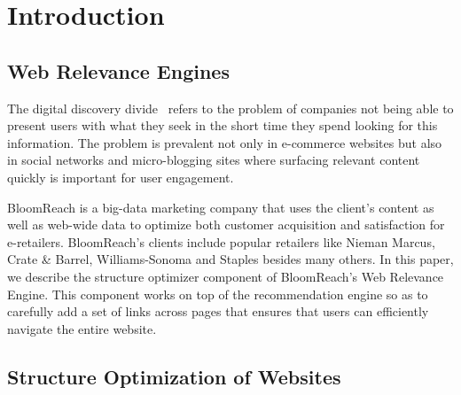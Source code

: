 \section{Introduction}

\subsection{Web Relevance Engines}
The digital discovery divide~\cite{WebRelevanceEngine} refers to the problem of companies not being able to present users with what they seek in the short time they spend looking for this information. The problem is prevalent not only in e-commerce websites but also in social networks and micro-blogging sites where surfacing relevant content quickly is important for user engagement.  

BloomReach is a big-data marketing company that uses the client's content as well as web-wide data to optimize both customer acquisition and satisfaction for e-retailers.
BloomReach's clients include popular retailers like Nieman Marcus, Crate \& Barrel, Williams-Sonoma and Staples besides many others. In this paper, we describe the structure optimizer component of BloomReach's Web Relevance Engine. This component works on top of the recommendation engine so as to carefully add a set of links across pages that ensures that users can efficiently navigate the entire website.

\subsection{Structure Optimization of Websites}



